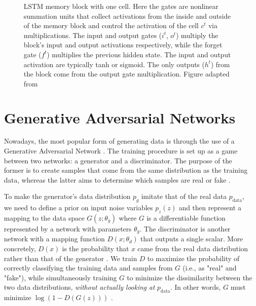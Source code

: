 \documentclass[a4paper]{book}
\begin{document}
\begin{figure}[t]
    \caption{LSTM memory block with one cell. Here the gates are nonlinear summation units that collect activations from the inside and outside of the memory block and control the activation of the cell $c^t$ via multiplications. The input and output gates ($i^t$, $o^t$) multiply the block's input and output activations respectively, while the forget gate ($f^t$) multiplies the previous hidden state. The input and output activation are typically tanh or sigmoid. The only outputs ($h^t$) from the block come from the output gate multiplication. Figure adapted from \textcite{graves_supervised_2012}}
    \label{fig:lstm}
\end{figure}

\section{Generative Adversarial Networks} \label{sec:generative}

Nowadays, the most popular form of generating data is through the use of a Generative Adversarial Network \parencite[GAN;][]{goodfellow_generative_2014}. The training procedure is set up as a game between two networks: a generator and a discriminator. The purpose of the former is to create samples that come from the same distribution as the training data, whereas the latter aims to determine which samples are real or fake \parencite{goodfellow_nips_2016}.

To make the generator's data distribution $p_g$ imitate that of the real data $p_{\text{data}}$, we need to define a prior on input noise variables $p_{z}(z)$ and then represent a mapping to the data space $G(z; \theta_g)$ where $G$ is a differentiable function represented by a network with parameters $\theta_g$. The discriminator is another network with a mapping function $D(x; \theta_d)$ that outputs a single scalar. More concretely, $D(x)$ is the probability that $x$ came from the real data distribution rather than that of the generator \parencite{goodfellow_nips_2016}. We train $D$ to maximize the probability of correctly classifying the training data and samples from $G$ (i.e., as "real" and "fake"), while simultaneously training $G$ to minimize the dissimilarity between the two data distributions, \emph{without actually looking at} $p_{\text{data}}$. In other words, $G$ must minimize $\log (1- D(G(z)))$ \parencite{goodfellow_generative_2014}.
\end{document}
